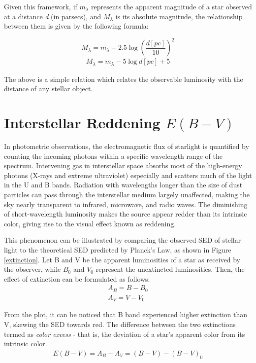 Given this framework, if $m_\lambda$ represents the apparent magnitude of a star observed at a distance \textit{d} (in parsecs), and $M_\lambda$ is its absolute magnitude, the relationship between them is given by the following formula:

$$M_\lambda = m_\lambda - 2.5\log \left( \frac{d[pc]}{10}\right)^2 $$
\begin{align}
M_\lambda = m_\lambda - 5\log{d[pc]}  + 5 
\end{align}

The above is a simple relation which relates the observable luminosity with the distance of any stellar object. 




\section{Interstellar Reddening $E(B-V)$}

In photometric observations, the electromagnetic flux of starlight is quantified by counting the incoming photons within a specific wavelength range of the spectrum. Intervening gas in interstellar space absorbs most of the high-energy photons (X-rays and extreme ultraviolet) especially and scatters much of the light in the U and B bands. Radiation with wavelengths longer than the size of dust particles can pass through the interstellar medium largely unaffected, making the sky nearly transparent to infrared, microwave, and radio waves. The diminishing of short-wavelength luminosity makes the source appear redder than its intrinsic color, giving rise to the visual effect known as reddening.





This phenomenon can be illustrated by comparing the observed SED of stellar light to the theoretical SED predicted by Planck's Law, as shown in Figure \ref{extinction}. Let B and V be the apparent luminosities of a star as received by the observer, while $B_0$ and $V_0$ represent the unextincted luminosities. Then, the effect of extinction can be formulated as follows:
\begin{align}
A_B = B - B_0 \\
A_V = V - V_0 
\end{align} 

From the plot, it can be noticed that B band experienced higher extinction than V, skewing the SED towards red. The difference between the two extinctions termed as \textit{color excess} - that is, the deviation of a star's apparent color from its intrinsic color. 
\begin{align}
E(B-V) = A_B - A_V = (B - V) - (B - V)_0 
\end{align} 

